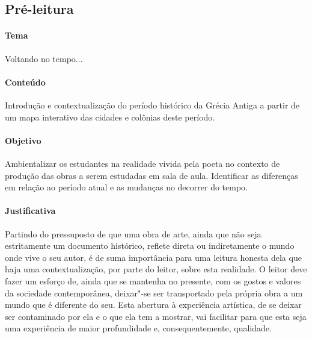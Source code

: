 \documentclass[12pt]{extarticle}
\begin{document}

\subsection{Pré-leitura}


\paragraph{Tema} Voltando no tempo...

\paragraph{Conteúdo} Introdução e contextualização do período histórico
da Grécia Antiga a partir de um mapa interativo das cidades e colônias 
deste período.

\paragraph{Objetivo} Ambientalizar os estudantes na realidade vivida pela
poeta no contexto de produção das obras a serem estudadas em sala de aula.
Identificar as diferenças em relação ao período atual e as mudanças no decorrer
do tempo.

\paragraph{Justificativa} Partindo do pressuposto de que uma obra de arte, ainda
que não seja estritamente um documento histórico, reflete direta ou indiretamente
o mundo onde vive o seu autor, é de suma importância para uma leitura honesta
dela que haja uma contextualização, por parte do leitor, sobre esta realidade. 
O leitor deve fazer um esforço de, ainda que se mantenha no presente, com os
gostos e valores da sociedade contemporânea, deixar"-se ser transportado
pela própria obra a um mundo que é diferente do seu. Esta abertura à experiência
artística, de se deixar ser contaminado por ela e o que ela tem a mostrar,
vai facilitar para que esta seja uma experiência de maior profundidade e, 
consequentemente, qualidade. 
\end{document}
